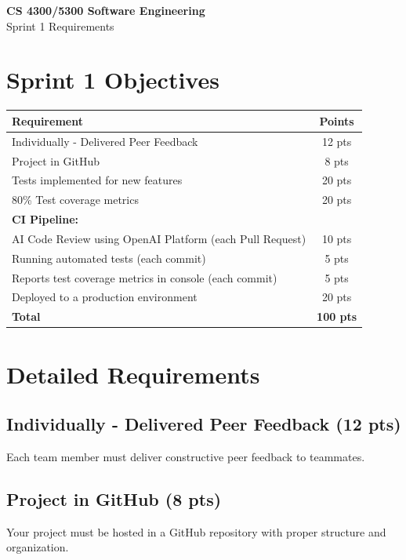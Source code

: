 \documentclass[11pt]{article}
\begin{document}
\begin{center}
{\LARGE\textbf{CS 4300/5300 Software Engineering}}\\[0.5em]
{\Large Sprint 1 Requirements}\\[1em]
\end{center}

\section{Sprint 1 Objectives}

\begin{center}
\begin{tabular}{lc}
\toprule
\textbf{Requirement} & \textbf{Points} \\
\midrule
Individually - Delivered Peer Feedback & 12 pts \\
Project in GitHub & 8 pts \\
Tests implemented for new features & 20 pts \\
80\% Test coverage metrics & 20 pts \\
\midrule
\multicolumn{2}{l}{\textbf{CI Pipeline:}} \\
\quad AI Code Review using OpenAI Platform (each Pull Request) & 10 pts \\
\quad Running automated tests (each commit) & 5 pts \\
\quad Reports test coverage metrics in console (each commit) & 5 pts \\
\midrule
Deployed to a production environment & 20 pts \\
\midrule
\textbf{Total} & \textbf{100 pts} \\
\bottomrule
\end{tabular}
\end{center}

\section{Detailed Requirements}

\subsection{Individually - Delivered Peer Feedback (12 pts)}
Each team member must deliver constructive peer feedback to teammates.

\subsection{Project in GitHub (8 pts)}
Your project must be hosted in a GitHub repository with proper structure and organization.
\end{document}
